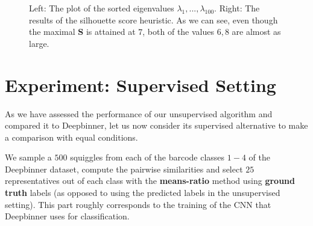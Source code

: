 \begin{figure}[!ht]
    \centering
    \qquad
    \caption[Scoring scheme construction.]{Left: The plot of the sorted eigenvalues $\lambda_1, ..., \lambda_{100}$. Right: The results of the silhouette score heuristic. As we can see, even though the maximal \textbf{S} is attained at $7$, both of the values $6,8$ are almost as large.}%
    \label{fig:clusters_estimation}%
\end{figure}


\section{Experiment: Supervised Setting}
As we have assessed the performance of our unsupervised algorithm and compared it to Deepbinner, let us now consider its supervised alternative to make a comparison with equal conditions.

We sample a $500$ squiggles from each of the barcode classes $1-4$ of the Deepbinner dataset, compute the pairwise similarities and select $25$ representatives out of each class with the \textbf{means-ratio} method using \textbf{ground truth} labels (as opposed to using the predicted labels in the unsupervised setting). This part roughly corresponds to the training of the CNN that Deepbinner uses for classification.

